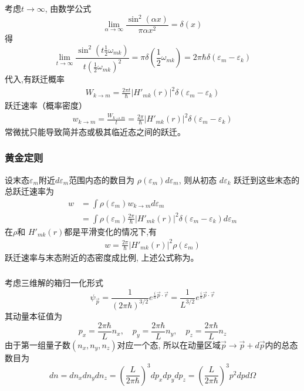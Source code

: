\begin{frame} 
  \frametitle{}
  考虑$t\to \infty$, 由数学公式
  \[ \lim_{\alpha \to \infty} \frac{\sin^2 (\alpha x)}{\pi \alpha x^2} = \delta(x)\]
  得
  \[ \lim_{t \to \infty} \frac{\sin^2 (t \frac{1}{2} \omega _{mk} )}{ t (\frac{1}{2} \omega _{mk} )^2} = \pi\delta(\frac{1}{2} \omega _{mk} ) = 2 \pi \hbar \delta(\varepsilon _m - \varepsilon _k)\]
代入,有跃迁概率 
\begin{equation*}
  \begin{aligned}
    W_{k\to m} =  \frac{2\pi t}{\hbar} \left\vert H'_{mk}(r) \right\vert ^2 \delta(\varepsilon _m - \varepsilon _k)
  \end{aligned}
\end{equation*}
跃迁速率（概率密度）
\begin{equation*}
  \begin{aligned}
    w_{k\to m} = \frac{W_{k\to m} }{t} = \frac{2\pi }{\hbar} \left\vert H'_{mk}(r) \right\vert ^2 \delta(\varepsilon _m - \varepsilon _k)
  \end{aligned}
\end{equation*}
常微扰只能导致简并态或极其临近态之间的跃迁。
\end{frame} 

\begin{frame} 
  \frametitle{黄金定则}
设末态$\varepsilon _m$附近$d\varepsilon _m$范围内态的数目为
$\rho(\varepsilon _m)d\varepsilon _m$, 则从初态 $d\varepsilon _k$ 跃迁到这些末态的总跃迁速率为
\[ 
\begin{aligned}
  w &= \int \rho(\varepsilon _m) w_{k\to m} d \varepsilon _m  \\ 
  &= \int \rho(\varepsilon _m) \frac{2\pi }{\hbar} \left\vert H'_{mk}(r) \right\vert ^2 \delta(\varepsilon _m - \varepsilon _k) d \varepsilon _m 
\end{aligned}  
\] 
在$\rho$和 $H'_{mk}(r)$都是平滑变化的情况下,有
\[ 
\begin{aligned}
  \boxed{w = \frac{2\pi }{\hbar} \left\vert H'_{mk}(r) \right\vert ^2 \rho(\varepsilon _m) } 
\end{aligned}  
\] 
跃迁速率与末态附近的态密度成比例,  上述公式称为\emf[黄金定则]。
\end{frame} 

\begin{frame} 
  \frametitle{}
\解 考虑三维解的箱归一化形式 
\[ \psi _{\vec{p}}= \frac{1}{(2\pi \hbar)^{3/2}}e^{\frac{i}{\hbar} \vec{p}\cdot\vec{r}} = \frac{1}{L^{3/2}}e^{\frac{i}{\hbar} \vec{p}\cdot\vec{r}}
\]
其动量本征值为
\[p_x = \frac{2\pi \hbar}{L} n_x, \quad p_y = \frac{2\pi \hbar}{L} n_y, \quad p_z = \frac{2\pi \hbar}{L} n_z\]
由于第一组量子数$(n_x, n_y, n_z)$对应一个态, 所以在动量区域$\vec{p}\to \vec{p}+ d \vec{p}$内的总态数目为
\[ dn = dn_x dn_y dn_z =(\frac{L}{2\pi \hbar})^3 dp_x dp_y dp_z =  (\frac{L}{2\pi \hbar})^3 p^2 dp d  \Omega\] 
\end{frame} 

